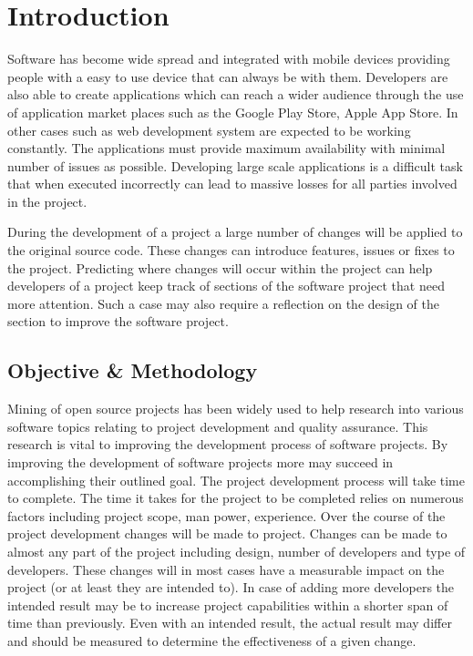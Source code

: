 \chapter{Introduction}
\label{chap:introduction}

Software has become wide spread and integrated with mobile devices providing people with a easy to use device that can always be with them. Developers are also able to create applications which can reach a wider audience through the use of application market places such as the Google Play Store, Apple App Store. In other cases such as web development system are expected to be working constantly. The applications must provide maximum availability with minimal number of issues as possible. Developing large scale applications is a difficult task that when executed incorrectly can lead to massive losses for all parties involved in the project. 

During the development of a project a large number of changes will be applied to the original source code. These changes can introduce features, issues or fixes to the project. Predicting where changes will occur within the project can help developers of a project keep track of sections of the software project that need more attention. Such a case may also require a reflection on the design of the section to improve the software project.

\section{Objective \& Methodology}

Mining of open source projects has been widely used to help research into various software topics relating to project development and quality assurance. This research is vital to improving the development process of software projects. By improving the development of software projects more may succeed in accomplishing their outlined goal. The project development process will take time to complete. The time it takes for the project to be completed relies on numerous factors including project scope, man power, experience. Over the course of the project development changes will be made to project. Changes can be made to almost any part of the project including design, number of developers and type of developers. These changes will in most cases have a measurable impact on the project (or at least they are intended to). In case of adding more developers the intended result may be to increase project capabilities within a shorter span of time than previously. Even with an intended result, the actual result may differ and should be measured to determine the effectiveness of a given change.

